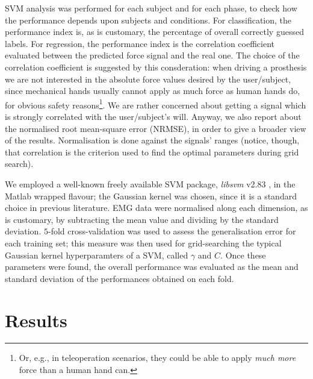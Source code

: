 \documentclass[10pt]{bmc_article}
\def\texttt{[image: ]}
\newenvironment{bmcformat}{\begin{raggedright}\baselineskip20pt\sloppy\setboolean{publ}{false}}{\end{raggedright}\baselineskip20pt\sloppy}
\begin{document}
\begin{bmcformat}
SVM analysis was performed for each subject and for each phase,
to check how the performance depends upon subjects and conditions.
For classification, the performance index is, as is
customary, the percentage of overall correctly guessed labels. For
regression, the performance index is the correlation coefficient
evaluated between the predicted force signal and the real one. The choice
of the correlation coefficient is suggested by this consderation:
when driving a prosthesis we are
not interested in the absolute force values desired by the
user/subject, since mechanical hands usually cannot apply as much
force as human hands do, for obvious safety reasons\footnote{Or, e.g.,
in teleoperation scenarios, they could be able to apply \emph{much
more} force than a human hand can.}. We are rather concerned about
getting a signal which is strongly correlated with the user/subject's will.
Anyway, we also report about the normalised root mean-square error (NRMSE),
in order to give a broader view of the results. Normalisation is done against the
signals' ranges (notice, though, that correlation is the criterion used to
find the optimal parameters during grid search).

We employed a well-known freely available SVM package, \emph{libsvm}
v2.83 \cite{ChangL01}, in the Matlab wrapped flavour; the Gaussian kernel
was chosen, since it is a standard choice in previous literature.
EMG data were normalised along each dimension, as is customary, by subtracting
the mean value and dividing by the standard deviation. $5$-fold cross-validation was
used to assess the generalisation error for each training set; this measure
was then used for grid-searching the typical Gaussian kernel hyperparamters
of a SVM, called $\gamma$ and $C$. Once these parameters were found, the overall
performance was evaluated as the mean and standard deviation of the performances
obtained on each fold.



\section*{Results}
\label{sec:exp}


\end{bmcformat}
\end{document}
